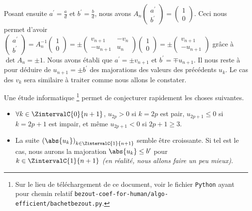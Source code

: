Posant ensuite $a^\prime = \frac{a}{d}$ et  $b^\prime = \frac{b}{d}$, nous avons
$A_n
 \begin{pmatrix}
 	a^\prime  \\
	b^\prime
 \end{pmatrix}
 =
 \begin{pmatrix}
 	1 \\
	0	
 \end{pmatrix}$.
Ceci nous permet d'avoir
$\begin{pmatrix}
 	a^\prime  \\
	b^\prime
 \end{pmatrix}
 =
 A_n^{-1}
 \begin{pmatrix}
 	1 \\
	0	
 \end{pmatrix}
 =
 \pm
 \begin{pmatrix}
	 v_{n+1}  & -v_n     \\
	 -u_{n+1} & u_n	
 \end{pmatrix}
 \begin{pmatrix}
 	1 \\
	0	
 \end{pmatrix}
 =
 \pm
 \begin{pmatrix}
 	v_{n+1}  \\
	-u_{n+1}	
 \end{pmatrix}$
grâce à $\det A_n = \pm 1$.
Nous avons établi que $a^\prime = \pm v_{n+1}$ et $b^\prime = \mp u_{n+1}$. Il nous reste à  pour déduire de $u_{n+1} = \pm b^\prime$ des majorations des valeurs des précédents $u_k$. Le cas des $v_k$ sera similaire à traiter comme nous allons le constater.


\medskip


Une étude informatique
\footnote{
	Sur le lieu de téléchargement de ce document, voir le fichier \texttt{Python} ayant pour chemin relatif \texttt{bezout-coef-for-human/algo-efficient/bachetbezout.py}.
}
permet de conjecturer rapidement les choses suivantes.

\begin{itemize}[label = \small\textbullet]
	\item $\forall k \in \ZintervalC{0}{n+1}$, $u_{2p} > 0$ si $k = 2p$ est pair, $u_{2p+1} \leq 0$ si $k = 2p+1$ est impair, et même $u_{2p+1} < 0$ si $2p + 1 \geq 3$.


	\item La suite $\left( \abs{u_k} \right)_{k \in \ZintervalC{1}{n+1}}$ semble être croissante. Si tel est le cas, nous aurons la majoration $\abs{u_k} \leq b^\prime$ pour $k \in \ZintervalC{1}{n+1}$ \emph{(en réalité, nous allons faire un peu mieux)}.
\end{itemize}


